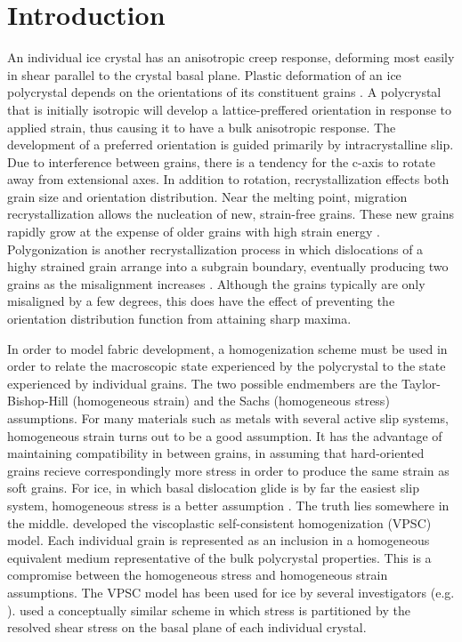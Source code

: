 \documentclass{article}
\begin{document}
\section{Introduction}
An individual ice crystal has an anisotropic creep response, deforming most easily in shear parallel to the crystal basal plane. Plastic deformation of an ice polycrystal depends on the orientations of its constituent grains \citep{azuma94}. A polycrystal that is initially isotropic will develop a lattice-preffered orientation in response to applied strain, thus causing it to have a bulk anisotropic response. The development of a preferred orientation is guided primarily by intracrystalline slip. Due to interference between grains, there is a tendency for the c-axis to rotate away from extensional axes. In addition to rotation, recrystallization effects both grain size and orientation distribution. Near the melting point, migration recrystallization allows the nucleation of new, strain-free grains. These new grains rapidly grow at the expense of older grains with high strain energy \citep{duval1995}. Polygonization is another recrystallization process in which dislocations of a highy strained grain arrange into a subgrain boundary, eventually producing two grains as the misalignment increases \citep{alley96}. Although the grains typically are only misaligned by a few degrees, this does have the effect of preventing the orientation distribution function from attaining sharp maxima.

In order to model fabric development, a homogenization scheme must be used in order to relate the macroscopic state experienced by the polycrystal to the state experienced by individual grains. The two possible endmembers are the Taylor-Bishop-Hill (homogeneous strain) \citep{taylor} and the Sachs (homogeneous stress) \citep{sachs} assumptions. For many materials such as metals with several active slip systems, homogeneous strain turns out to be a good assumption. It has the advantage of maintaining compatibility in between grains, in assuming that hard-oriented grains recieve correspondingly more stress in order to produce the same strain as soft grains. For ice, in which basal dislocation glide is by far the easiest slip system, homogeneous stress is a better assumption \citep{throstur2000}. The truth lies somewhere in the middle. \citet{molinari} developed the viscoplastic self-consistent homogenization (VPSC) model. Each individual grain is represented as an inclusion in a homogeneous equivalent medium representative of the bulk polycrystal properties. This is a compromise between the homogeneous stress and homogeneous strain assumptions. The VPSC model has been used for ice by several investigators (e.g. \citet{gillet2005}). \citet{azuma96} used a conceptually similar scheme in which stress is partitioned by the resolved shear stress on the basal plane of each individual crystal. 
\end{document}
